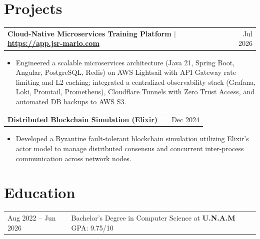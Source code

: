 \documentclass[a4paper,11pt]{article}
\makeatletter
\newenvironment{joblong}[2]
    {
    \begin{tabularx}{\linewidth}{@{}l X r@{}}
    \textbf{#1} & \hfill &  #2 \\[3.75pt]
    \end{tabularx}
    \begin{minipage}[t]{\linewidth}
    \begin{itemize}[nosep,after=\strut, leftmargin=1em, itemsep=3pt]
    }
    {
    \end{itemize}
    \end{minipage}    
    }
\makeatother
\begin{document}
\section{Projects}

\begin{joblong}{Cloud-Native Microservices Training Platform $|$ \textnormal{\small \url{https://app.jsr-mario.com}}}{Jul 2026}
\item Engineered a scalable microservices architecture (Java 21, Spring Boot, Angular, PostgreSQL, Redis) on AWS Lightsail with API Gateway rate limiting and L2 caching; integrated a centralized observability stack (Grafana, Loki, Promtail, Prometheus), Cloudflare Tunnels with Zero Trust Access, and automated DB backups to AWS S3.
\end{joblong}

\begin{joblong}{Distributed Blockchain Simulation (Elixir)}{Dec 2024}
\item Developed a Byzantine fault-tolerant blockchain simulation utilizing Elixir's actor model to manage distributed consensus and concurrent inter-process communication across network nodes.
\end{joblong}

%

\section{Education}
\begin{tabularx}{\linewidth}{@{}l X@{}}	
Aug 2022 -- Jun 2026 & Bachelor's Degree in Computer Science at \textbf{U.N.A.M} \hfill GPA: 9.75/10 
\end{tabularx}
\end{document}
